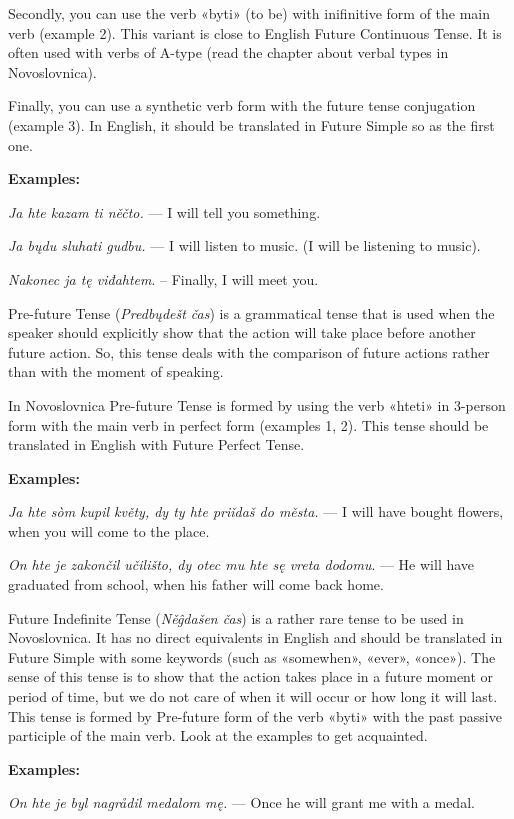 Secondly, you can use the verb «byti» (to be) with inifinitive form of the main verb (example 2). This variant is close to English Future Continuous Tense. It is often used with verbs of A-type (read the chapter about verbal types in Novoslovnica).

Finally, you can use a synthetic verb form with the future tense conjugation (example 3). In English, it should be translated in Future Simple so as the first one.

\textbf{Examples:}

\textit{Ja hte kazam ti něčto.} — I will tell you something.

\textit{Ja bųdu sluhati gudbu.} — I will listen to music. (I will be listening to music).

\textit{Nakonec ja tę viđahtem}. – Finally, I will meet you.

Pre-future Tense (\textit{Predbųdešt čas}) is a grammatical tense that is used when the speaker should explicitly show that the action will take place before another future action. So, this tense deals with the comparison of future actions rather than with the moment of speaking.

In Novoslovnica Pre-future Tense is formed by using the verb «hteti» in 3-person form with the main verb in perfect form (examples 1, 2). This tense should be translated in English with Future Perfect Tense.

\textbf{Examples:}

\textit{Ja hte sòm kupil květy, dy ty hte priǐdaš do města.} — I will have bought flowers, when you will come to the place.

\textit{On hte je zakončil učilišto, dy otec mu hte sę vreta dodomu}. — He will have graduated from school, when his father will come back home.

Future Indefinite Tense (\textit{Něĝdašen čas}) is a rather rare tense to be used in Novoslovnica. It has no direct equivalents in English and should be translated in Future Simple with some keywords (such as «somewhen», «ever», «once»). The sense of this tense is to show that the action takes place in a future moment or period of time, but we do not care of when it will occur or how long it will last.
This tense is formed by Pre-future form of the verb «byti» with the past passive participle of the main verb. Look at the examples to get acquainted.

\textbf{Examples:}

\textit{On hte je byl nagrådil medalom mę.} — Once he will grant me with a medal.

